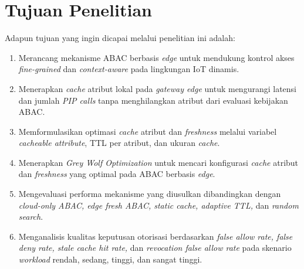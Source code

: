 \section{Tujuan Penelitian}

Adapun tujuan yang ingin dicapai melalui penelitian ini adalah:

\begin{enumerate}
    \item Merancang mekanisme ABAC berbasis \textit{edge} untuk mendukung kontrol akses \textit{fine-grained} dan \textit{context-aware} pada lingkungan IoT dinamis.
    \item Menerapkan \textit{cache} atribut lokal pada \textit{gateway edge} untuk mengurangi latensi dan jumlah \textit{PIP calls} tanpa menghilangkan atribut dari evaluasi kebijakan ABAC.
    \item Memformulasikan optimasi \textit{cache} atribut dan \textit{freshness} melalui variabel \textit{cacheable attribute}, TTL per atribut, dan ukuran \textit{cache}.
    \item Menerapkan \textit{Grey Wolf Optimization} untuk mencari konfigurasi \textit{cache} atribut dan \textit{freshness} yang optimal pada ABAC berbasis \textit{edge}.
    \item Mengevaluasi performa mekanisme yang diusulkan dibandingkan dengan \textit{cloud-only ABAC, edge fresh ABAC, static cache, adaptive TTL,} dan \textit{random search}.
    \item Menganalisis kualitas keputusan otorisasi berdasarkan \textit{false allow rate, false deny rate, stale cache hit rate,} dan \textit{revocation false allow rate} pada skenario \textit{workload} rendah, sedang, tinggi, dan sangat tinggi.  
\end{enumerate}
